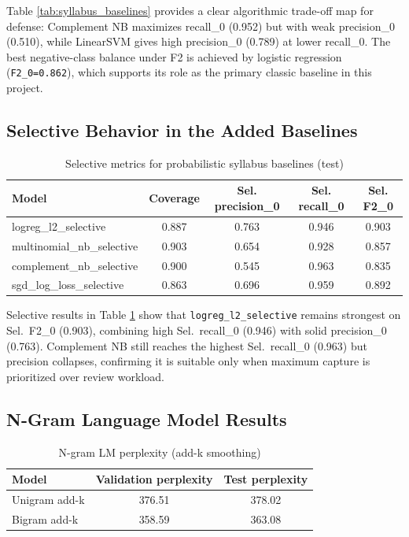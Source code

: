 \documentclass[12pt,a4paper]{article}
\begin{document}
Table \ref{tab:syllabus_baselines} provides a clear algorithmic trade-off map for defense: Complement NB maximizes recall\_0 (0.952) but with weak precision\_0 (0.510), while LinearSVM gives high precision\_0 (0.789) at lower recall\_0. The best negative-class balance under F2 is achieved by logistic regression (\texttt{F2\_0=0.862}), which supports its role as the primary classic baseline in this project.

\subsection{Selective Behavior in the Added Baselines}
\begin{table}[H]
\centering
\caption{Selective metrics for probabilistic syllabus baselines (test)}
\label{tab:syllabus_selective}
\begin{tabular}{lcccc}
\toprule
Model & Coverage & Sel. precision\_0 & Sel. recall\_0 & Sel. F2\_0 \\
\midrule
logreg\_l2\_selective & 0.887 & 0.763 & 0.946 & 0.903 \\
multinomial\_nb\_selective & 0.903 & 0.654 & 0.928 & 0.857 \\
complement\_nb\_selective & 0.900 & 0.545 & 0.963 & 0.835 \\
sgd\_log\_loss\_selective & 0.863 & 0.696 & 0.959 & 0.892 \\
\bottomrule
\end{tabular}
\end{table}

Selective results in Table \ref{tab:syllabus_selective} show that \texttt{logreg\_l2\_selective} remains strongest on Sel.\ F2\_0 (0.903), combining high Sel.\ recall\_0 (0.946) with solid precision\_0 (0.763). Complement NB still reaches the highest Sel.\ recall\_0 (0.963) but precision collapses, confirming it is suitable only when maximum capture is prioritized over review workload.

\subsection{N-Gram Language Model Results}
\begin{table}[H]
\centering
\caption{N-gram LM perplexity (add-k smoothing)}
\label{tab:ngram_ppl}
\begin{tabular}{lcc}
\toprule
Model & Validation perplexity & Test perplexity \\
\midrule
Unigram add-k & 376.51 & 378.02 \\
Bigram add-k & 358.59 & 363.08 \\
\bottomrule
\end{tabular}
\end{table}
\end{document}
